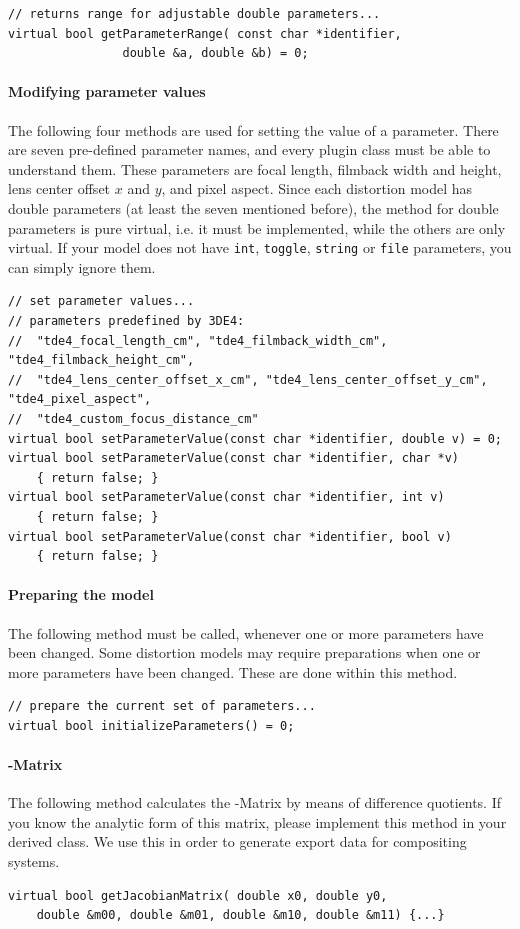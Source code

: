 \documentclass[10pt,a4paper]{article}
\begin{document}
\begin{lstlisting}[language=mycpp,tabsize=8]
// returns range for adjustable double parameters...
virtual bool getParameterRange(	const char *identifier,
				double &a, double &b) = 0;
\end{lstlisting}
\paragraph{Modifying parameter values}
The following four methods are used for setting the value of a parameter.
There are seven pre-defined parameter names, and every plugin class must be able to
understand them. These parameters are focal length, filmback width and height,
lens center offset $x$ and $y$, and pixel aspect. Since each distortion model
has double parameters (at least the seven mentioned before), the method for
double parameters is pure virtual, i.e. it must be implemented, while the others
are only virtual. If your model does not have {\tt int}, {\tt toggle}, {\tt string} or {\tt file}
parameters, you can simply ignore them.
\begin{lstlisting}[language=mycpp,tabsize=8]
// set parameter values...
// parameters predefined by 3DE4:
// 	"tde4_focal_length_cm", "tde4_filmback_width_cm", "tde4_filmback_height_cm",
//	"tde4_lens_center_offset_x_cm", "tde4_lens_center_offset_y_cm", "tde4_pixel_aspect",
//	"tde4_custom_focus_distance_cm"
virtual bool setParameterValue(const char *identifier, double v) = 0;
virtual bool setParameterValue(const char *identifier, char *v)
	{ return false; }
virtual bool setParameterValue(const char *identifier, int v)
	{ return false; }
virtual bool setParameterValue(const char *identifier, bool v)
	{ return false; }
\end{lstlisting}
\paragraph{Preparing the model}
The following method must be called, whenever one or more parameters have been changed.
Some distortion models may require preparations when one or more parameters
have been changed. These are done within this method.
\begin{lstlisting}[language=mycpp,tabsize=8]
// prepare the current set of parameters...
virtual bool initializeParameters() = 0;
\end{lstlisting}
%
\paragraph{\Jacobi-Matrix}
The following method calculates the \Jacobi-Matrix by means of difference quotients.
If you know the analytic form of this matrix, please implement this method in your derived class.
We use this in order to generate export data for compositing systems.
\begin{lstlisting}[language=mycpp,tabsize=8]
virtual bool getJacobianMatrix(	double x0, double y0,
	double &m00, double &m01, double &m10, double &m11) {...}
\end{lstlisting}
%
\end{document}
